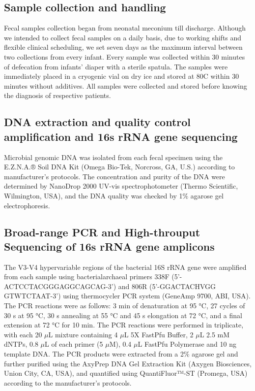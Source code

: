 \documentclass[fleqn,10pt, lineno]{wlpeerj} %
\begin{document}
  \subsection*{Sample collection and handling}
  Fecal samples collection began from neonatal meconium till discharge. Although we intended to collect fecal samples on a daily basis, due to working shifts and flexible clinical scheduling, we set seven days as the maximum interval between two collections from every infant. Every sample was collected within 30 minutes of defecation from infants' diaper with a sterile spatula. The samples were immediately placed in a cryogenic vial on dry ice and stored at 80\textdegree{}C within 30 minutes without additives. All samples were collected and stored before knowing the diagnosis of respective patients.

  \subsection*{DNA extraction and quality control amplification and 16s rRNA gene sequencing}
  Microbial genomic DNA was isolated from each fecal specimen using the E.Z.N.A.® Soil DNA Kit (Omega Bio-Tek, Norcross, GA, U.S.) according to manufacturer’s protocols. The concentration and purity of the DNA were determined by NanoDrop 2000 UV-vis spectrophotometer (Thermo Scientific, Wilmington, USA), and the DNA quality was checked by 1\% agarose gel electrophoresis.

  \subsection*{Broad-range PCR and High-throuput Sequencing of 16s rRNA gene amplicons}
  The V3-V4 hypervariable regions of the bacterial 16S rRNA gene were amplified from each sample using bacterial\/archaeal primers 338F (5’-ACTCCTACGGGAGGCAGCAG-3’) and 806R (5’-GGACTACHVGG GTWTCTAAT-3’) using thermocycler PCR system (GeneAmp 9700, ABI, USA). The PCR reactions were as follows: 3 min of denaturation at 95 °C, 27 cycles of 30 s at 95 °C, 30 s annealing at 55 °C and 45 s elongation at 72 °C, and a final extension at 72 °C for 10 min. The PCR reactions were performed in triplicate, with each 20 $\mu$L mixture containing 4 $\mu$L 5X FastPfu Buffer, 2 $\mu$L 2.5 mM dNTPs, 0.8 $\mu$L of each primer (5 $\mu$M), 0.4 $\mu$L FastPfu Polymerase and 10 ng template DNA. The PCR products were extracted from a 2\% agarose gel and further purified using the AxyPrep DNA Gel Extraction Kit (Axygen Biosciences, Union City, CA, USA), and quantified using QuantiFluor™-ST (Promega, USA) according to the manufacturer’s protocols.
\end{document}
